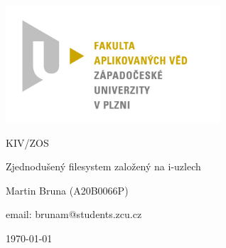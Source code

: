 \documentclass[a4paper,12pt]{article}
\begin{document}
\begin{titlepage}
		\centering
		
		\includegraphics[width=8cm]{favlogo.jpg}
			
		\vspace{2cm}
			
		{\Huge KIV/ZOS}
			
		\vspace{1cm}
			
		{\Large Zjednodušený filesystem založený na i-uzlech}
		
		\vspace{3cm}
		
		{\Large Martin Bruna (A20B0066P)}\par
		email: brunam@students.zcu.cz
		
		\vfill
		
		\today
\end{titlepage}

\setcounter{secnumdepth}{4}
\setcounter{tocdepth}{4}
\tableofcontents
\newpage
\end{document}
